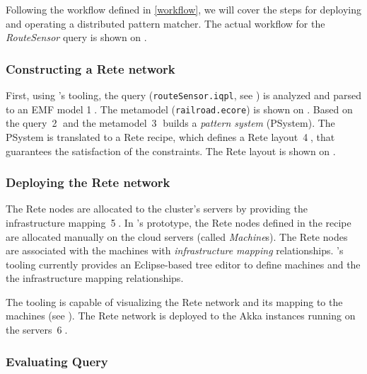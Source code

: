 Following the workflow defined in \autoref{workflow}, we will cover the steps for deploying and operating a distributed pattern matcher. The actual workflow for the \textit{RouteSensor} query is shown on .

\subsubsection{Constructing a Rete network}

First, using \eiq{}'s tooling, the query (\texttt{routeSensor.iqpl}, see ) is analyzed and parsed to an EMF model %
\textcircled{1}. The metamodel (\texttt{railroad.ecore}) is shown on . Based on the query~\textcircled{2} and the metamodel~\textcircled{3} \eiq{} builds a \emph{pattern system} (PSystem). The PSystem is translated to a Rete recipe, which defines a Rete layout~\textcircled{4}, that guarantees the satisfaction of the constraints. The Rete layout is shown on .


\subsubsection{Deploying the Rete network}

The Rete nodes are allocated to the cluster's servers by providing the infrastructure mapping~\textcircled{5}. In \iqd{}'s prototype, the Rete nodes defined in the recipe are allocated manually on the cloud servers (called \textit{Machine}s). The Rete nodes are associated with the machines with \textit{infrastructure mapping} relationships. \iqd{}'s tooling currently provides an Eclipse-based tree editor to define machines and the the infrastructure mapping relationships. 

The tooling is capable of visualizing the Rete network and its mapping to the machines (see ).
The Rete network is deployed to the Akka instances running on the servers~\textcircled{6}.


\subsubsection{Evaluating Query}

